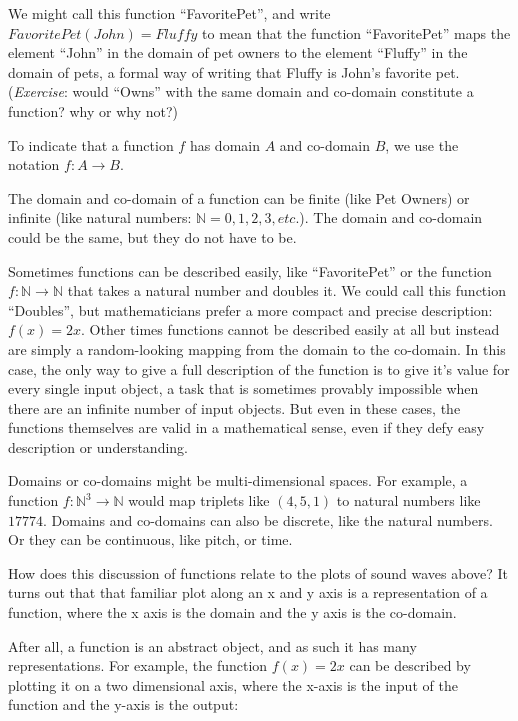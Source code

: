 \documentclass[UTF8]{book}
\begin{document}
\begin{CJK}{UTF8}{gbsn}
We might call this function ``FavoritePet'', and write $FavoritePet(John) = Fluffy$ to mean that the function ``FavoritePet'' maps the element ``John'' in the domain of pet owners to the element ``Fluffy'' in the domain of pets, a formal way of writing that Fluffy is John's favorite pet. (\emph{Exercise}: would ``Owns'' with the same domain and co-domain constitute a function? why or why not?)

To indicate that a function $f$ has domain $A$ and co-domain $B$, we use the notation $f: A \rightarrow B$.

The domain and co-domain of a function can be finite (like Pet Owners) or infinite (like natural numbers: $\mathbb{N} = {0, 1, 2, 3, etc.}$). The domain and co-domain could be the same, but they do not have to be.

Sometimes functions can be described easily, like ``FavoritePet'' or the function $f: \mathbb{N} \rightarrow \mathbb{N}$ that takes a natural number and doubles it. We could call this function ``Doubles'', but mathematicians prefer a more compact and precise description: $f(x) = 2x$. Other times functions cannot be described easily at all but instead are simply a random-looking mapping from the domain to the co-domain. In this case, the only way to give a full description of the function is to give it's value for every single input object, a task that is sometimes provably impossible when there are an infinite number of input objects. But even in these cases, the functions themselves are valid in a mathematical sense, even if they defy easy description or understanding.

Domains or co-domains might be multi-dimensional spaces. For example, a function $f: \mathbb{N}^{3} \rightarrow \mathbb{N}$ would map triplets like $(4,5,1)$ to natural numbers like $17774$. Domains and co-domains can also be discrete, like the natural numbers. Or they can be continuous, like pitch, or time.

How does this discussion of functions relate to the plots of sound waves above? It turns out that that familiar plot along an x and y axis is a representation of a function, where the x axis is the domain and the y axis is the co-domain.

After all, a function is an abstract object, and as such it has many representations. For example, the function $f(x)=2x$ can be described by plotting it on a two dimensional axis, where the x-axis is the input of the function and the y-axis is the output:



\end{CJK}
\end{document}
